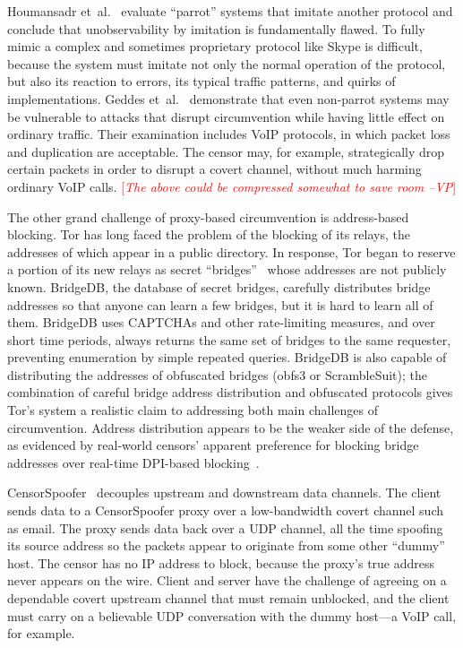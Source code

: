 \documentclass{sig-alternate}
\newcommand{\note}[1]{{\textcolor{red}{[\textit{#1}]}}}
\newcommand{\vp}[1]{\note{#1 --VP}}
\begin{document}
Houmansadr et~al.~\cite{parrot} evaluate ``parrot'' systems that imitate another protocol
and conclude that unobservability by imitation is fundamentally flawed.
To fully mimic a complex and sometimes proprietary protocol like Skype
is difficult,
because the system must imitate not only the normal operation of the protocol,
but also its reaction to errors,
its typical traffic patterns, and quirks of implementations.
Geddes et~al.~\cite{acks}
demonstrate that even non-parrot systems may be vulnerable to
attacks that disrupt circumvention while having little effect
on ordinary traffic.
Their examination includes VoIP protocols,
in which packet loss and duplication are acceptable.
The censor may, for example, strategically drop certain packets
in order to disrupt a covert channel, without much harming ordinary VoIP calls.
\vp{The above could be compressed somewhat to save room}


The other grand challenge of proxy-based circumvention is address-based blocking.
Tor has long faced the problem of the blocking of its relays,
the addresses of which appear in a public directory.
In response, Tor began to reserve a portion of its
new relays as secret ``bridges''~\cite{tor-blocking}
whose addresses are not publicly known.
BridgeDB, the database of secret bridges,
carefully distributes bridge addresses
so that anyone can learn a few bridges, but it is hard to learn all of them.
BridgeDB uses CAPTCHAs and other rate-limiting measures,
and over short time periods,
always returns the same set of bridges to the same requester,
preventing enumeration by simple repeated queries.
BridgeDB is also capable of distributing the addresses
of obfuscated bridges (obfs3 or ScrambleSuit);
the combination
of careful bridge address distribution and obfuscated protocols
gives Tor's system a realistic claim to addressing both main challenges of circumvention.
Address distribution appears to be the weaker side of the defense,
as evidenced by real-world censors' apparent preference for
blocking bridge addresses over real-time DPI-based blocking~\cite{foci12-winter}.

CensorSpoofer~\cite{censorspoofer}
decouples upstream and downstream data channels.
The client sends data to a CensorSpoofer proxy over a low-bandwidth covert channel such as email.
The proxy sends data back over a UDP channel, all the time
spoofing its source address so the packets appear to originate from some other ``dummy'' host.
The censor has no IP address to block, because the proxy's true address never appears on the wire.
Client and server have the challenge of agreeing on a dependable covert upstream channel
that must remain unblocked,
and the client must carry on a believable UDP conversation with the dummy host---a
VoIP call, for example.
\end{document}
